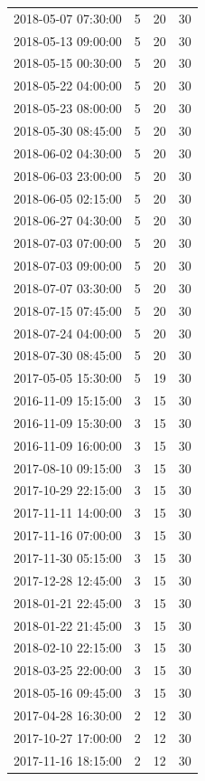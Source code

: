 \begin{tabular}{lrrr}
2018-05-07 07:30:00 & 5 & 20 & 30 \\
2018-05-13 09:00:00 & 5 & 20 & 30 \\
2018-05-15 00:30:00 & 5 & 20 & 30 \\
2018-05-22 04:00:00 & 5 & 20 & 30 \\
2018-05-23 08:00:00 & 5 & 20 & 30 \\
2018-05-30 08:45:00 & 5 & 20 & 30 \\
2018-06-02 04:30:00 & 5 & 20 & 30 \\
2018-06-03 23:00:00 & 5 & 20 & 30 \\
2018-06-05 02:15:00 & 5 & 20 & 30 \\
2018-06-27 04:30:00 & 5 & 20 & 30 \\
2018-07-03 07:00:00 & 5 & 20 & 30 \\
2018-07-03 09:00:00 & 5 & 20 & 30 \\
2018-07-07 03:30:00 & 5 & 20 & 30 \\
2018-07-15 07:45:00 & 5 & 20 & 30 \\
2018-07-24 04:00:00 & 5 & 20 & 30 \\
2018-07-30 08:45:00 & 5 & 20 & 30 \\
2017-05-05 15:30:00 & 5 & 19 & 30 \\
2016-11-09 15:15:00 & 3 & 15 & 30 \\
2016-11-09 15:30:00 & 3 & 15 & 30 \\
2016-11-09 16:00:00 & 3 & 15 & 30 \\
2017-08-10 09:15:00 & 3 & 15 & 30 \\
2017-10-29 22:15:00 & 3 & 15 & 30 \\
2017-11-11 14:00:00 & 3 & 15 & 30 \\
2017-11-16 07:00:00 & 3 & 15 & 30 \\
2017-11-30 05:15:00 & 3 & 15 & 30 \\
2017-12-28 12:45:00 & 3 & 15 & 30 \\
2018-01-21 22:45:00 & 3 & 15 & 30 \\
2018-01-22 21:45:00 & 3 & 15 & 30 \\
2018-02-10 22:15:00 & 3 & 15 & 30 \\
2018-03-25 22:00:00 & 3 & 15 & 30 \\
2018-05-16 09:45:00 & 3 & 15 & 30 \\
2017-04-28 16:30:00 & 2 & 12 & 30 \\
2017-10-27 17:00:00 & 2 & 12 & 30 \\
2017-11-16 18:15:00 & 2 & 12 & 30 \\

\end{tabular}
